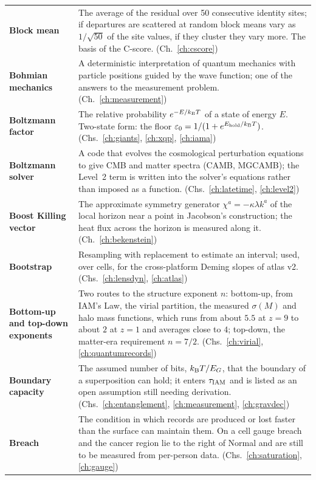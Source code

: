 {\begin{longtable}{@{}>{\raggedright\arraybackslash}p{}>{\raggedright\arraybackslash}p{}@{}}
\textbf{Block mean} & The average of the residual over 50 consecutive identity sites; if departures are scattered at random block means vary as $1/\sqrt{50}$ of the site values, if they cluster they vary more. The basis of the C-score. {\footnotesize(Ch.~\ref{ch:cscore})}\\[1pt]
\textbf{Bohmian mechanics} & A deterministic interpretation of quantum mechanics with particle positions guided by the wave function; one of the answers to the measurement problem. {\footnotesize(Ch.~\ref{ch:measurement})}\\[1pt]
\textbf{Boltzmann factor} & The relative probability $e^{-E/k_{\mathrm B} T}$ of a state of energy $E$. Two-state form: the floor $\varepsilon_0=1/(1+e^{E_{\rm hold}/k_{\mathrm B} T})$. {\footnotesize(Chs.~\ref{ch:giants}, \ref{ch:xqp}, \ref{ch:iama})}\\[1pt]
\textbf{Boltzmann solver} & A code that evolves the cosmological perturbation equations to give CMB and matter spectra (CAMB, MGCAMB); the Level~2 term is written into the solver's equations rather than imposed as a function. {\footnotesize(Chs.~\ref{ch:latetime}, \ref{ch:level2})}\\[1pt]
\textbf{Boost Killing vector} & The approximate symmetry generator $\chi^a=-\kappa\lambda k^a$ of the local horizon near a point in Jacobson's construction; the heat flux across the horizon is measured along it. {\footnotesize(Ch.~\ref{ch:bekenstein})}\\[1pt]
\textbf{Bootstrap} & Resampling with replacement to estimate an interval; used, over cells, for the cross-platform Deming slopes of atlas v2. {\footnotesize(Chs.~\ref{ch:lensdyn}, \ref{ch:atlas})}\\[1pt]
\textbf{Bottom-up and top-down exponents} & Two routes to the structure exponent $n$: bottom-up, from IAM's Law, the virial partition, the measured $\sigma(M)$ and halo mass functions, which runs from about $5.5$ at $z=9$ to about $2$ at $z=1$ and averages close to $4$; top-down, the matter-era requirement $n=7/2$. {\footnotesize(Chs.~\ref{ch:virial}, \ref{ch:quantumrecords})}\\[1pt]
\textbf{Boundary capacity} & The assumed number of bits, $k_{\mathrm B} T/E_G$, that the boundary of a superposition can hold; it enters $\tau_{\rm IAM}$ and is listed as an open assumption still needing derivation. {\footnotesize(Chs.~\ref{ch:entanglement}, \ref{ch:measurement}, \ref{ch:gravdec})}\\[1pt]
\textbf{Breach} & The condition in which records are produced or lost faster than the surface can maintain them. On a cell gauge breach and the cancer region lie to the right of Normal and are still to be measured from per-person data. {\footnotesize(Chs.~\ref{ch:saturation}, \ref{ch:gauge})}\\[1pt]

\end{longtable}}
